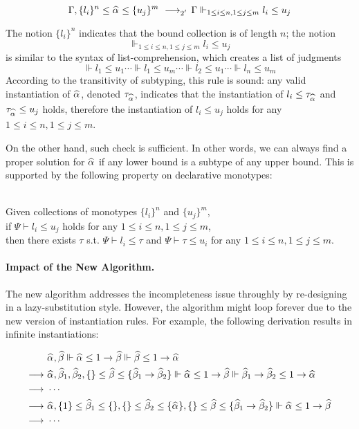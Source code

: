$$
\Gm, \{l_i\}^n \le \al \le \{u_j\}^m \rrule{2'} \Gm \Vdash_{1 \le i \le n, 1 \le j \le m} l_i \le u_j
$$

The notion $\{l_i\}^n$ indicates that the bound collection is of length $n$;
the notion
$$\Vdash_{1 \le i \le n, 1 \le j \le m} l_i \le u_j$$
is similar to the syntax of list-comprehension, which creates a list of judgments
$$\Vdash l_1 \le u_1 \cdots \Vdash l_1 \le u_m \cdots \Vdash l_2 \le u_1
\cdots \Vdash l_n \le u_m$$
According to the transitivity of subtyping, this rule is sound:
any valid instantiation of $\al$, denoted $\tau_{\al}$, indicates that
the instantiation of $l_i \le \tau_{\al}$ and $\tau_{\al} \le u_j$ holds,
therefore the instantiation of $l_i \le u_j$ holds for any $1 \le i \le n, 1 \le j \le m$.

On the other hand, such check is sufficient. In other words,
we can always find a proper solution for $\al$ if any lower bound
is a subtype of any upper bound.
This is supported by the following property on declarative monotypes:
\begin{lemma}~\\
    Given collections of monotypes $\{l_i\}^n$ and $\{u_j\}^m$,\\
    if $\Psi \vdash l_i \le u_j$ holds for any $1 \le i \le n, 1 \le j \le m$,\\
    then there exists $\tau$ s.t. $\Psi \vdash l_i \le \tau$ and $\Psi \vdash \tau \le u_i$
    for any $1 \le i \le n, 1 \le j \le m$.
\end{lemma}

\paragraph{Impact of the New Algorithm.}

The new algorithm addresses the incompleteness issue throughly by
re-designing in a lazy-substitution style.
However, the algorithm might loop forever due to the
new version of instantiation rules.
For example, the following derivation results in infinite instantiations:

\begin{gather*}
    \begin{aligned}
     & \al, \bt \Vdash \al \le 1 \to \bt \Vdash \bt \le 1 \to \al\\
\rto~& \al, \bt[1], \bt[2], \{\} \le \bt \le \{\bt[1] \to \bt[2]\}
        \Vdash \al \le 1 \to \bt \Vdash \bt[1] \to \bt[2] \le 1 \to \al\\
\rto~& \cdots\\
\rto~& \al, \{1\} \le \bt[1] \le \{\}, \{\} \le \bt[2] \le \{\al\},
        \{\} \le \bt \le \{\bt[1] \to \bt[2]\}
        \Vdash \al \le 1 \to \bt\\
\rto~& \cdots\\
    \end{aligned}
\end{gather*}

